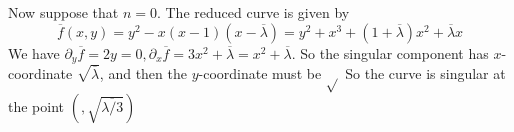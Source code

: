 \bigskip
Now suppose that $n = 0$.  
The reduced curve is given by \[
	\overline{f}(x, y) = y^2 - x (x-1)(x-\overline{\lambda}) = y^2 + x^3 + (1 + \overline{\lambda})x^2 + \overline{\lambda}x
\]
We have $\partial_y \overline{f} = 2y = 0, \partial_x \overline{f} = 3x^2 + \overline{\lambda} = x^2 + \overline{\lambda}$. 
So the singular component has $x$-coordinate $\sqrt{\overline{\lambda}} $, and then the $y$-coordinate must be $\sqrt{} $
So the curve is singular at the point $(,\sqrt{\overline{\lambda / 3}}) $









